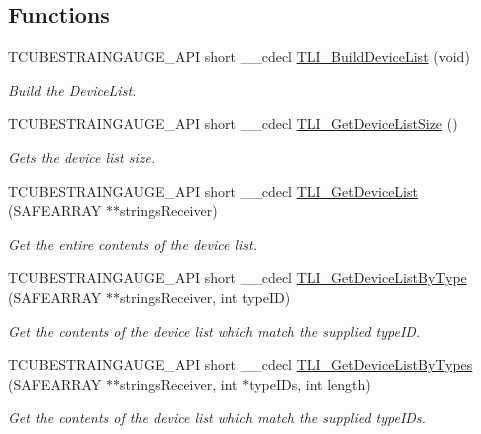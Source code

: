 \subsection*{Functions}
\begin{DoxyCompactItemize}
\item 
T\+C\+U\+B\+E\+S\+T\+R\+A\+I\+N\+G\+A\+U\+G\+E\+\_\+\+A\+PI short \+\_\+\+\_\+cdecl \hyperlink{group___t_cube_strain_gauge_gaf153be06b6f55fcb3e1682d0ebf8a5c4}{T\+L\+I\+\_\+\+Build\+Device\+List} (void)
\begin{DoxyCompactList}\small\item\em Build the Device\+List. \end{DoxyCompactList}\item 
T\+C\+U\+B\+E\+S\+T\+R\+A\+I\+N\+G\+A\+U\+G\+E\+\_\+\+A\+PI short \+\_\+\+\_\+cdecl \hyperlink{group___t_cube_strain_gauge_gaddc77d9edda2607aae386c9fbe891f6d}{T\+L\+I\+\_\+\+Get\+Device\+List\+Size} ()
\begin{DoxyCompactList}\small\item\em Gets the device list size. \end{DoxyCompactList}\item 
T\+C\+U\+B\+E\+S\+T\+R\+A\+I\+N\+G\+A\+U\+G\+E\+\_\+\+A\+PI short \+\_\+\+\_\+cdecl \hyperlink{group___t_cube_strain_gauge_gab8d739baa862510985ad1a88d704f216}{T\+L\+I\+\_\+\+Get\+Device\+List} (S\+A\+F\+E\+A\+R\+R\+AY $\ast$$\ast$strings\+Receiver)
\begin{DoxyCompactList}\small\item\em Get the entire contents of the device list. \end{DoxyCompactList}\item 
T\+C\+U\+B\+E\+S\+T\+R\+A\+I\+N\+G\+A\+U\+G\+E\+\_\+\+A\+PI short \+\_\+\+\_\+cdecl \hyperlink{group___t_cube_strain_gauge_gacb7e1978dbd2da60aa770e2c0fc65bca}{T\+L\+I\+\_\+\+Get\+Device\+List\+By\+Type} (S\+A\+F\+E\+A\+R\+R\+AY $\ast$$\ast$strings\+Receiver, int type\+ID)
\begin{DoxyCompactList}\small\item\em Get the contents of the device list which match the supplied type\+ID. \end{DoxyCompactList}\item 
T\+C\+U\+B\+E\+S\+T\+R\+A\+I\+N\+G\+A\+U\+G\+E\+\_\+\+A\+PI short \+\_\+\+\_\+cdecl \hyperlink{group___t_cube_strain_gauge_gafcc8e13a6966db5c55133e23b538df8d}{T\+L\+I\+\_\+\+Get\+Device\+List\+By\+Types} (S\+A\+F\+E\+A\+R\+R\+AY $\ast$$\ast$strings\+Receiver, int $\ast$type\+I\+Ds, int length)
\begin{DoxyCompactList}\small\item\em Get the contents of the device list which match the supplied type\+I\+Ds. \end{DoxyCompactList}\item 
$$
\end{DoxyCompactItemize}
